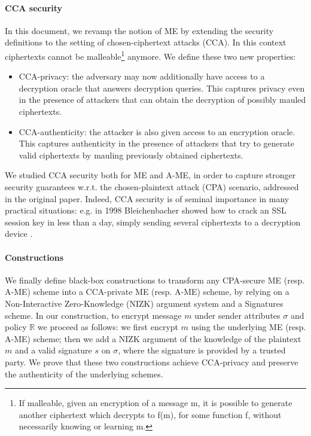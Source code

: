 \paragraph{CCA security}
In this document, we revamp the notion of ME by extending the security definitions to the setting of chosen-ciphertext attacks (CCA).
In this context ciphertexts cannot be malleable\footnote{If malleable, given an encryption of a message m, it is possible to generate another ciphertext which decrypts to f(m), for some function f, without necessarily knowing or learning m.} anymore. We define these two new properties:
\begin{itemize}
    \item CCA-privacy: the adversary may now additionally have access to a decryption oracle that answers decryption queries. This captures privacy even in the presence of attackers that can obtain the decryption of possibly mauled ciphertexts.
    \item CCA-authenticity: the attacker is also given access to an encryption oracle. This captures authenticity in the presence of attackers that try to generate valid ciphertexts by mauling previously obtained ciphertexts.
\end{itemize}
We studied CCA security both for ME and A-ME, in order to capture stronger security guarantees w.r.t. the chosen-plaintext attack (CPA) scenario, addressed in the original paper.
Indeed, CCA security is of seminal importance in many practical situations: e.g. in 1998 Bleichenbacher showed how to crack an SSL session key in less than a day, simply sending several ciphertexts to a decryption device \cite{Bleichenbacher}.

\paragraph{Constructions}
We finally define black-box constructions to transform any CPA-secure ME (resp. A-ME) scheme into a CCA-private ME (resp. A-ME) scheme, by relying on a Non-Interactive Zero-Knowledge (NIZK) argument system and a Signatures scheme.
\newline
In our construction, to encrypt message $m$ under sender attributes $\sigma$ and policy $\mathbb{R}$ we proceed as follows: we first encrypt $m$ using the underlying ME (resp. A-ME) scheme; then we add a NIZK argument of the knowledge of the plaintext $m$ and a valid signature $s$ on $\sigma$, where the signature is provided by a trusted party.
\newline
We prove that these two constructions achieve CCA-privacy and preserve the authenticity of the underlying schemes.
